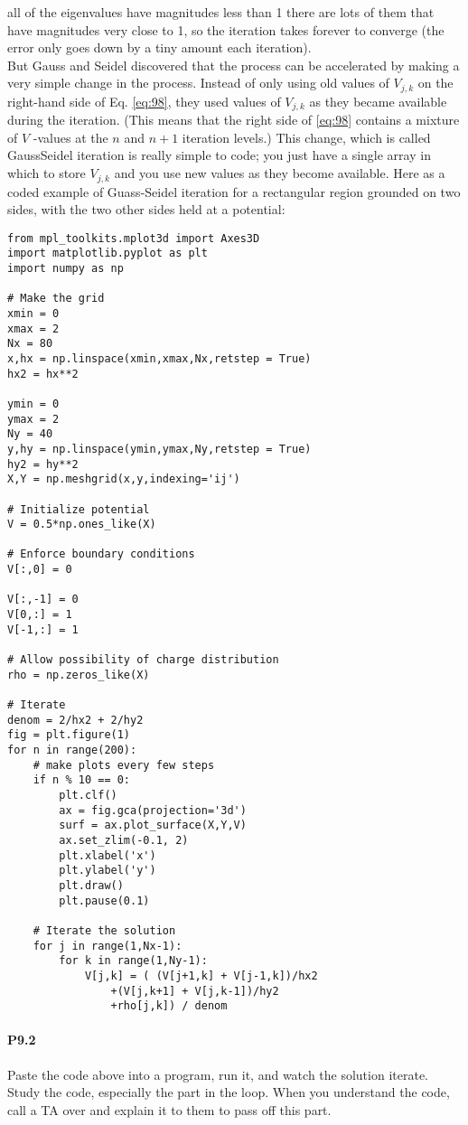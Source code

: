 all of the eigenvalues have magnitudes less than 1 there are lots of them that have
magnitudes very close to 1, so the iteration takes forever to converge (the error
only goes down by a tiny amount each iteration). \\ 
But Gauss and Seidel discovered that the process can be accelerated by making
a very simple change in the process. Instead of only using old values of $V_{j,k}$ on
the right-hand side of Eq. \eqref{eq:98}, they used values of $V_{j,k}$ as they became available
during the iteration. (This means that the right side of \eqref{eq:98} contains a mixture
of $V$ -values at the $n$ and $n +1$ iteration levels.) This change, which is called GaussSeidel iteration is really simple to code; you just have a single array in which to
store $V_{j,k}$ and you use new values as they become available. Here as a coded
example of Guass-Seidel iteration for a rectangular region grounded on two sides,
with the two other sides held at a potential:
\begin{lstlisting}
from mpl_toolkits.mplot3d import Axes3D
import matplotlib.pyplot as plt
import numpy as np

# Make the grid
xmin = 0
xmax = 2
Nx = 80
x,hx = np.linspace(xmin,xmax,Nx,retstep = True)
hx2 = hx**2

ymin = 0
ymax = 2
Ny = 40
y,hy = np.linspace(ymin,ymax,Ny,retstep = True)
hy2 = hy**2
X,Y = np.meshgrid(x,y,indexing='ij')

# Initialize potential
V = 0.5*np.ones_like(X)

# Enforce boundary conditions
V[:,0] = 0

V[:,-1] = 0
V[0,:] = 1
V[-1,:] = 1

# Allow possibility of charge distribution
rho = np.zeros_like(X)

# Iterate
denom = 2/hx2 + 2/hy2
fig = plt.figure(1)
for n in range(200):
	# make plots every few steps
	if n % 10 == 0:
		plt.clf()
		ax = fig.gca(projection='3d')
		surf = ax.plot_surface(X,Y,V)
		ax.set_zlim(-0.1, 2)
		plt.xlabel('x')
		plt.ylabel('y')
		plt.draw()
		plt.pause(0.1)

	# Iterate the solution
	for j in range(1,Nx-1):
		for k in range(1,Ny-1):
			V[j,k] = ( (V[j+1,k] + V[j-1,k])/hx2
				+(V[j,k+1] + V[j,k-1])/hy2
				+rho[j,k]) / denom
\end{lstlisting}
\paragraph*{P9.2}  Paste the code above into a program, run it, and watch the solution iterate.
Study the code, especially the part in the loop. When you understand the
code, call a TA over and explain it to them to pass off this part.


